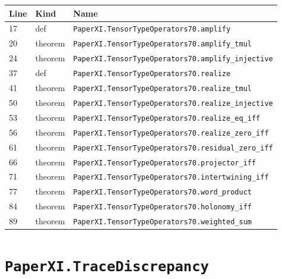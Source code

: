 \documentclass[10pt,oneside]{book}
\begin{document}
\begin{longtable}{@{}p{}p{}p{}@{}}\toprule Line&Kind&Name\\\midrule\endhead

17&def&\nolinkurl{PaperXI.TensorTypeOperators70.amplify}\\

20&theorem&\nolinkurl{PaperXI.TensorTypeOperators70.amplify_tmul}\\

24&theorem&\nolinkurl{PaperXI.TensorTypeOperators70.amplify_injective}\\

37&def&\nolinkurl{PaperXI.TensorTypeOperators70.realize}\\

41&theorem&\nolinkurl{PaperXI.TensorTypeOperators70.realize_tmul}\\

50&theorem&\nolinkurl{PaperXI.TensorTypeOperators70.realize_injective}\\

53&theorem&\nolinkurl{PaperXI.TensorTypeOperators70.realize_eq_iff}\\

56&theorem&\nolinkurl{PaperXI.TensorTypeOperators70.realize_zero_iff}\\

61&theorem&\nolinkurl{PaperXI.TensorTypeOperators70.residual_zero_iff}\\

66&theorem&\nolinkurl{PaperXI.TensorTypeOperators70.projector_iff}\\

71&theorem&\nolinkurl{PaperXI.TensorTypeOperators70.intertwining_iff}\\

77&theorem&\nolinkurl{PaperXI.TensorTypeOperators70.word_product}\\

84&theorem&\nolinkurl{PaperXI.TensorTypeOperators70.holonomy_iff}\\

89&theorem&\nolinkurl{PaperXI.TensorTypeOperators70.weighted_sum}\\

\bottomrule\end{longtable}

\section{\texorpdfstring{\nolinkurl{PaperXI.TraceDiscrepancy}}{PaperXI.TraceDiscrepancy}}\label{module:PaperXI.TraceDiscrepancy}
\end{document}
